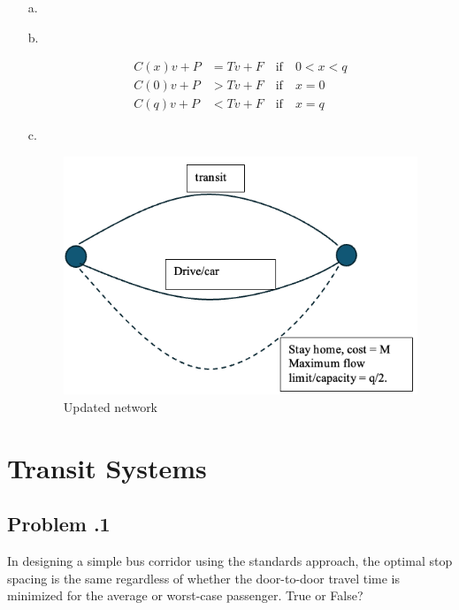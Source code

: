 \documentclass[12pt]{article}
\newcommand{\customsubsection}[1]{
  \subsection*{Problem \thesection.#1}
}
\begin{document}
\begin{enumerate}
    \item [a.] 

    

\item[b.] 

\begin{align*}
    C(x)v + P &= Tv + F \quad \text{if} \quad 0 < x < q \\
    C(0)v + P &> Tv + F \quad \text{if} \quad x = 0 \\
    C(q)v + P &< Tv + F \quad \text{if} \quad x = q
\end{align*}

\item[c.]  
\begin{figure}
    \centering
    \includegraphics[width=0.5\linewidth]{img/Prb9.3.png}
    \caption{Updated network}
    \label{fig:enter-label}
\end{figure}
\end{enumerate}


\newpage



\section{Transit Systems}

\customsubsection{1}
In designing a simple bus corridor using the standards approach, the optimal stop spacing is the same regardless of whether the door-to-door travel time is minimized for the average or worst-case passenger. True or False?
\end{document}

